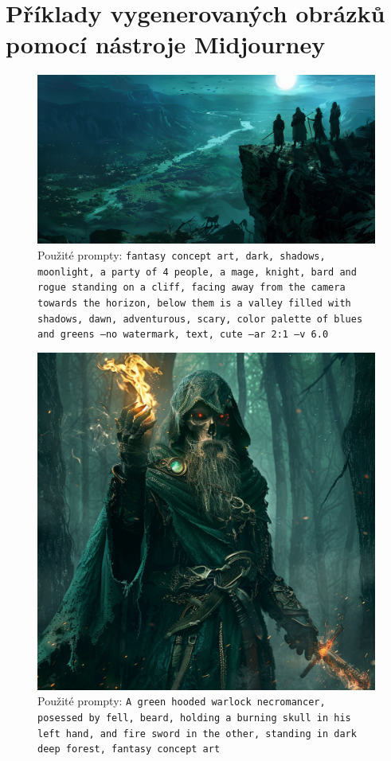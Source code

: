 \chapter{Příklady vygenerovaných obrázků pomocí nástroje Midjourney}

\begin{figure}
    \centering
    \includegraphics[width=\textwidth]{resources/figures/theme.png}
    \caption{Použité prompty: \texttt{fantasy concept art, dark, shadows, moonlight, a party of 4 people, a mage, knight, bard and rogue standing on a cliff, facing away from the camera towards the horizon, below them is a valley filled with shadows, dawn, adventurous, scary, color palette of blues and greens --no watermark, text, cute --ar 2:1 --v 6.0}}
    \label{fig:theme}
\end{figure}

\begin{figure}[h]
  \centering
  \includegraphics[width=\textwidth]{resources/figures/undeadSkeletNecro.png}
  \caption{Použité prompty: \texttt{A green hooded warlock necromancer, posessed by fell, beard, holding a burning skull in his left hand, and fire sword in the other, standing in dark deep forest, fantasy concept art}}
  \label{fig:undeadSkeletNecro}
\end{figure}

